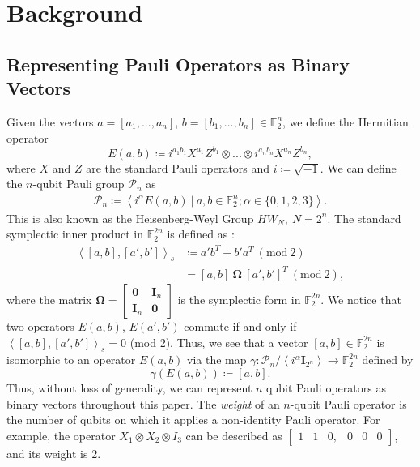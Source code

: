 \documentclass[conference]{IEEEtran}
\begin{document}




\section{Background}




\subsection{Representing Pauli Operators as  Binary Vectors}
Given the vectors $ a=[a_{1},...,a_{n}]$, $ b=[b_{1},...,b_{n}]\in \mathbb{F}^{n}_{2}$, we define the Hermitian operator
\begin{equation}
    E(a,b) \coloneqq i^{a_{1}b_{1}}X^{a_{1}}Z^{b_{1}}\otimes...\otimes i^{a_{n}b_{n}}X^{a_{n}}Z^{b_{n}}, 
\end{equation}
where $X$ and $Z$ are the standard Pauli operators and $i \coloneqq \sqrt{-1}$.
We can define the $n$-qubit Pauli group $\mathcal{P}_{n}$ as
\begin{equation}
\begin{aligned}
    \mathcal{P}_{n} \coloneqq \left< i^{\alpha} E(a,b)\ | \ a,b \in \mathbb{F}^{n}_{2}; \alpha \in \{0,1,2,3\} \right>.
\end{aligned}
\end{equation}
This is also known as the Heisenberg-Weyl Group $HW_{N}, \ N=2^{n}$. 
The standard symplectic inner product in $\mathbb{F}^{2n}_{2}$ is defined as \cite{rengaswamy2018synthesis}:
\begin{align}
\left<[a,b],[a',b']\right>_{s} & \coloneqq a'b^{T}+b'a^{T} \ (\mathrm{mod} \ 2) \nonumber \\
%
\label{eq:symp_inn_pdt}
  &= [a,b]\ \mathrm{\boldsymbol{\Omega}}\ [a',b']^{T} \ (\mathrm{mod} \ 2),
\end{align}
where the matrix $\boldsymbol{\Omega}=\begin{bmatrix} 
  \boldsymbol{0} & \boldsymbol{I}_n \\
  \boldsymbol{I}_n & \boldsymbol{0}
  \end{bmatrix}$ is the symplectic form in $\mathbb{F}^{2n}_{2}$.
We notice that two operators  $E(a,b)$, $E(a',b')$ commute if and only if $\left<[a,b],[a',b']\right>_{s} =0$ (mod 2). Thus, we see that a vector $[a,b] \in \mathbb{F}^{2n}_{2} $ is isomorphic to an operator $E(a,b)$ via the map $\gamma: \mathcal{P}_{n}/\left<i^{\alpha} \boldsymbol{I}_{2^n}\right> \xrightarrow{} \mathbb{F}^{2n}_{2}$ defined by
\begin{equation}
\gamma(E(a,b)) \coloneqq [a,b].
\end{equation}
Thus, without loss of generality, we can represent $n$ qubit Pauli operators as binary vectors throughout this paper. 
The \textit{weight} of an $n$-qubit Pauli operator is the number of qubits on which it applies a non-identity Pauli operator.
For example, the operator $X_{1}\otimes X_{2} \otimes I_{3}$ can be described as $\begin{bmatrix} 1 & 1 & 0, & 0 & 0 & 0 \end{bmatrix}$, and its weight is $2$.
\end{document}
